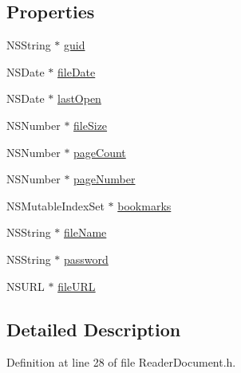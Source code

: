 \subsection*{Properties}
\begin{DoxyCompactItemize}
\item 
N\-S\-String $\ast$ \hyperlink{interface_reader_document_a1d10bceac39442fdd660c1696edf2573}{guid}
\item 
N\-S\-Date $\ast$ \hyperlink{interface_reader_document_adb6d224fb441a753e3f90baf4477c884}{file\-Date}
\item 
N\-S\-Date $\ast$ \hyperlink{interface_reader_document_a9c51a6e373b8657337a0924ab0f19cb8}{last\-Open}
\item 
N\-S\-Number $\ast$ \hyperlink{interface_reader_document_a4c9221246aa089f1471bb9f58022629d}{file\-Size}
\item 
N\-S\-Number $\ast$ \hyperlink{interface_reader_document_ac41f9c6f4b2b8c109ef03971eaa64225}{page\-Count}
\item 
N\-S\-Number $\ast$ \hyperlink{interface_reader_document_a5604d89843047aadab52a61f92837c4b}{page\-Number}
\item 
N\-S\-Mutable\-Index\-Set $\ast$ \hyperlink{interface_reader_document_aeb8333eda0eee2c0a48a43e2766ae31a}{bookmarks}
\item 
N\-S\-String $\ast$ \hyperlink{interface_reader_document_a1c95075453d9fde3a66ac3238496a8cb}{file\-Name}
\item 
N\-S\-String $\ast$ \hyperlink{interface_reader_document_a782c81876b82fa2f840f4bef6709ec4d}{password}
\item 
N\-S\-U\-R\-L $\ast$ \hyperlink{interface_reader_document_a76f21379e86bce6c49b5e7469494fdbc}{file\-U\-R\-L}
\end{DoxyCompactItemize}


\subsection{Detailed Description}


Definition at line 28 of file Reader\-Document.\-h.



